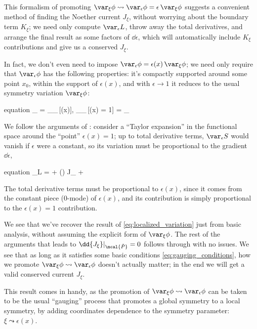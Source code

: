 \documentclass[a4paper
	,10pt
]{article}
\begin{document}
	\newparagraph
	This formalism of promoting $
		\var_\xi \phi
		\leadsto \var_\epsilon \phi
		= \epsilon\,\var_\xi \phi
	$ suggests a convenient method of finding the Noether current $J_\xi$, without worrying about the boundary term $K_\xi$; we need only compute $\var_\epsilon L$, throw away the total derivatives, and arrange the final result as some factors of $\dd{\epsilon}$, which will automatically include $K_\xi$ contributions and give us a conserved $J_\xi$. 
	
	In fact, we don't even need to impose $
		\var_\epsilon \phi
		= \epsilon(x)\,\var_\xi \phi
	$; we need only require that $\var_\epsilon \phi$ has the following properties: it's compactly supported around some point $x_0$, within the support of $\epsilon(x)$, and with $\epsilon \to 1$ it reduces to the usual symmetry variation $\var_\xi \phi$:
	\begin{empheq}{equation}
		\var_\epsilon \phi
		= \var_\epsilon \phi_{\,[\epsilon(x)]},
	\quad
		\var_\epsilon \phi_{\,[\epsilon(x) = 1]}
		= \var_\xi \phi
	\label{eq:gauging_conditions}
	\end{empheq}
	We follow the arguments of \textcite{Polchinski:1998rq}: consider a ``Taylor expansion'' in the functional space around the ``point'' $\epsilon(x) = 1$; up to total derivative terms, $\var_\epsilon S$ would vanish if $\epsilon$ were a constant, so its variation must be proportional to the gradient $\dd{\epsilon}$,
	\begin{empheq}{equation}
		\var_\epsilon L
		=  
			+ (\dd{\epsilon}) \wedge J_\xi
			+ 
	\end{empheq}
	The total derivative terms must be proportional to $\epsilon(x)$, since it comes from the constant piece (0-mode) of $\epsilon(x)$, and its contribution is simply proportional to the $\epsilon(x) = 1$ contribution. 
	
	We see that we've recover the result of \eqref{eq:localized_variation} just from basic analysis, without assuming the explicit form of $\var_\xi \phi$. The rest of the arguments that leads to $\dd{J_\xi}|_{\mcal{\tilde{P}}} = 0$ follows through with no issues. We see that as long as it satisfies some basic conditions \eqref{eq:gauging_conditions}, how we promote $\var_\xi \phi \leadsto \var_\epsilon \phi$ doesn't actually matter; in the end we will get a valid conserved current $J_\xi$. 
	
	This result comes in handy, as the promotion of $\var_\xi \phi \leadsto \var_\epsilon \phi$ can be taken to be the usual ``gauging'' process that promotes a global symmetry to a local symmetry, by adding coordinates dependence to the symmetry parameter: $\xi \leadsto \epsilon(x)$. 
	
\end{document}
